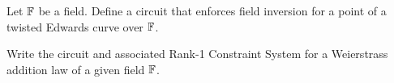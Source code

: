 \begin{comment}
\begin{example}[Baby-JubJub]
Considering our pen-and-paper baby-jubjub curve over from XXX\sme{add reference}. We recall from XXX\sme{add reference} that $(11,9)$ is a generator for the large prime order subgroup. We therefor already know from XXX\sme{add reference} that
$(11,9) + (7,8) = (11,9) + [3](11,9) = [4](11,9) = (2,9)$. So we execute the circuit  and get
\begin{align*}
x_1 = 11 & = S_1\\
x_2 = 7 & = S_2\\
y_1 = 9 & = S_3 \\
y_2 = 8 & = S_4 \\
1+ 8\cdot S_1\cdot S_2 \cd = 9 & = S_5 \\
y_3 = 8 & = S_6 \\
11 \cdot 8 = 10 & = S_7 \\
11 \cdot 7 =  12 & = S_8 \\
7 \cdot 9 =  11 & = S_9 \\
9 \cdot 8 = 7 & = S_{10} \\
12 \cdot 7 = 6 & = S_{11} \\
S_5 \cdot (1+ d\cdot S_{11}) & = 1 \\
S_6 \cdot (1 - d\cdot S_{11}) & = 1 \\
S_5 \cdot (S_9 + S_7) & = S_{14} \\
S_6 \cdot (S_{10} - a\cdot S_8) & = S_{15}
\end{align*}
\end{example}
\end{comment}
\begin{exercise}
Let $\mathbb{F}$ be a field. Define a circuit that enforces field inversion for a point of a twisted Edwards curve over $\mathbb{F}$.
\end{exercise}
\begin{exercise}
Write the circuit and associated Rank-1 Constraint System for a Weierstrass addition law of a given field $\mathbb{F}$.
\end{exercise}
